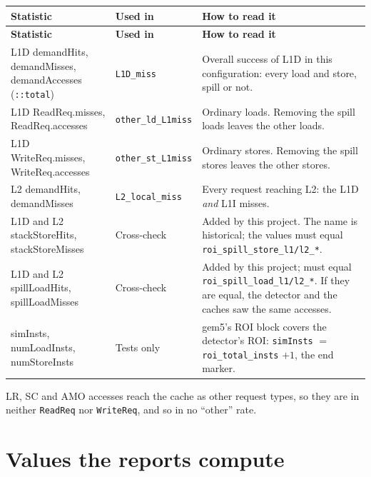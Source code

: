 \documentclass[10pt,a4paper]{article}
\newcommand{\ct}[1]{\texttt{#1}}
\newcommand{\tablehead}[2]{%
  \nobreak{\small\textbf{Table #1.} #2}\par\nobreak\vspace{2pt}}
\begin{document}
{\small
\begin{xltabular}{\textwidth}{@{}C{52mm} L{0.75} L{1.25}@{}}
\toprule
\normalfont\textbf{Statistic} & \textbf{Used in} & \textbf{How to read it} \\
\midrule
\endfirsthead
\toprule
\normalfont\textbf{Statistic} & \textbf{Used in} & \textbf{How to read it} \\
\midrule
\endhead
\bottomrule
\endlastfoot
L1D demandHits, demandMisses, demandAccesses (\ct{::total})
  & \ct{L1D\_miss}
  & Overall success of L1D in this configuration: every load and store,
    spill or not. \\
L1D ReadReq.misses, ReadReq.accesses
  & \ct{other\_ld\_L1miss}
  & Ordinary loads. Removing the spill loads leaves the other loads. \\
L1D WriteReq.misses, WriteReq.accesses
  & \ct{other\_st\_L1miss}
  & Ordinary stores. Removing the spill stores leaves the other stores. \\
L2 demandHits, demandMisses
  & \ct{L2\_local\_miss}
  & Every request reaching L2: the L1D \emph{and} L1I misses. \\
L1D and L2 stackStoreHits, stackStoreMisses
  & Cross-check
  & Added by this project. The name is historical; the values must equal
    \ct{roi\_spill\_store\_l1/l2\_*}. \\
L1D and L2 spillLoadHits, spillLoadMisses
  & Cross-check
  & Added by this project; must equal \ct{roi\_spill\_load\_l1/l2\_*}. If they
    are equal, the detector and the caches saw the same accesses. \\
simInsts, numLoadInsts, numStoreInsts
  & Tests only
  & gem5's ROI block covers the detector's ROI: \ct{simInsts} $=$
    \ct{roi\_total\_insts} $+ 1$, the end marker. \\
\end{xltabular}
}

LR, SC and AMO accesses reach the cache as other request types, so they are in
neither \ct{ReadReq} nor \ct{WriteReq}, and so in no ``other'' rate.

\section{Values the reports compute}

\tablehead{5}{Derived values.}
\end{document}
